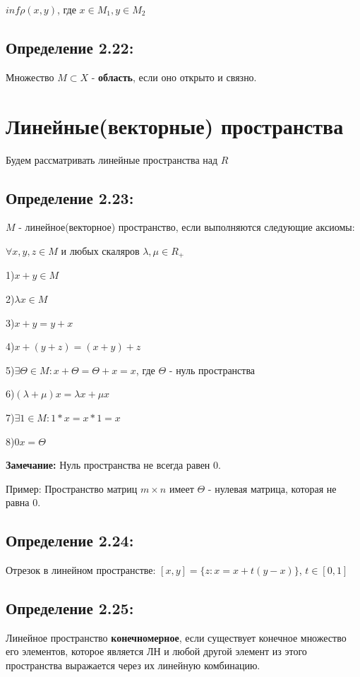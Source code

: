 \documentclass[12pt]{article}
\begin{document}
	$inf \rho(x,y)$, где $x \in M_1 , y \in M_2$
	
\subsection*{Определение 2.22:}
	Множество $M \subset X$ - \textbf{область}, если оно открыто и связно.

\newpage
\section{Линейные(векторные) пространства}
	Будем рассматривать линейные пространства над $R$
	
\subsection*{Определение 2.23:}
	$M$ - линейное(векторное) пространство, если выполняются следующие аксиомы:
	
	$\forall x,y,z \in M$  и любых скаляров $\lambda,\mu \in R_+$
	
	1)$ x + y \in M$
	
	2)$ \lambda x \in M$
	
	3)$x + y = y + x$
	
	4)$x + (y + z) = (x + y) + z$
	
	5)$\exists \Theta \in M : x + \Theta = \Theta + x = x$, где $\Theta$ - нуль пространства
	
	6)$(\lambda + \mu)x = \lambda x + \mu x$
	
	7)$\exists 1 \in M: 1*x = x * 1 = x$
	
	8)$0x = \Theta$

\textbf{Замечание:}
	Нуль пространства не всегда равен 0.
	
	Пример: Пространство матриц $m \times n$ имеет $\Theta$ - нулевая матрица, которая не равна 0.
	
\subsection*{Определение 2.24:}
	Отрезок в линейном пространстве: $[x,y] = \{ z : x = x + t(y-x) \}$, $t \in [0,1]$
\subsection*{Определение 2.25:}
	Линейное пространство \textbf{конечномерное}, если существует конечное множество его элементов, которое является ЛН и любой другой
	элемент из этого пространства выражается через их линейную комбинацию.
	
\end{document}
